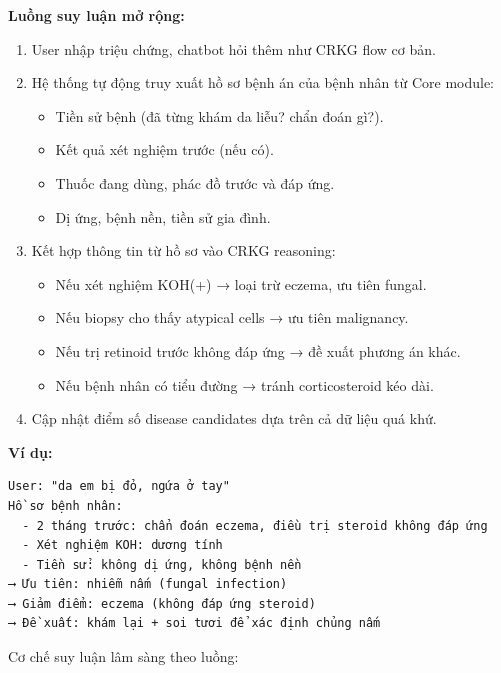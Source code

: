 \documentclass[12pt,a4paper]{article}
\begin{document}
\textbf{Luồng suy luận mở rộng:}
\begin{enumerate}
    \item User nhập triệu chứng, chatbot hỏi thêm như CRKG flow cơ bản.
    \item Hệ thống tự động truy xuất hồ sơ bệnh án của bệnh nhân từ Core module:
    \begin{itemize}
        \item Tiền sử bệnh (đã từng khám da liễu? chẩn đoán gì?).
        \item Kết quả xét nghiệm trước (nếu có).
        \item Thuốc đang dùng, phác đồ trước và đáp ứng.
        \item Dị ứng, bệnh nền, tiền sử gia đình.
    \end{itemize}
    \item Kết hợp thông tin từ hồ sơ vào CRKG reasoning:
    \begin{itemize}
        \item Nếu xét nghiệm KOH(+) → loại trừ eczema, ưu tiên fungal.
        \item Nếu biopsy cho thấy atypical cells → ưu tiên malignancy.
        \item Nếu trị retinoid trước không đáp ứng → đề xuất phương án khác.
        \item Nếu bệnh nhân có tiểu đường → tránh corticosteroid kéo dài.
    \end{itemize}
    \item Cập nhật điểm số disease candidates dựa trên cả dữ liệu quá khứ.
\end{enumerate}

\textbf{Ví dụ:}
\begin{verbatim}
User: "da em bị đỏ, ngứa ở tay"
Hồ sơ bệnh nhân:
  - 2 tháng trước: chẩn đoán eczema, điều trị steroid không đáp ứng
  - Xét nghiệm KOH: dương tính
  - Tiền sử: không dị ứng, không bệnh nền
⟶ Ưu tiên: nhiễm nấm (fungal infection)
⟶ Giảm điểm: eczema (không đáp ứng steroid)
⟶ Đề xuất: khám lại + soi tươi để xác định chủng nấm
\end{verbatim}

Cơ chế suy luận lâm sàng theo luồng:
\end{document}
